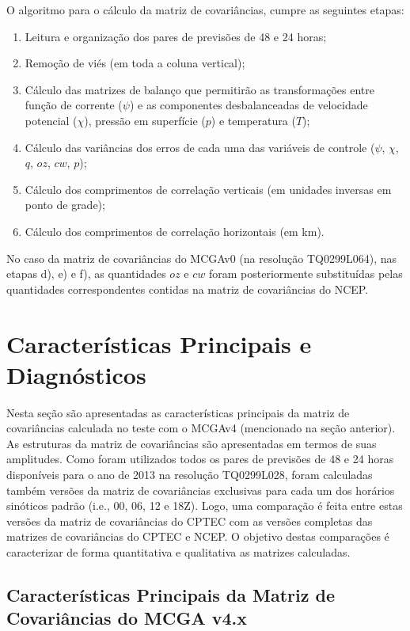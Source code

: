 O algoritmo para o cálculo da matriz de covariâncias, cumpre as seguintes etapas:

\begin{enumerate}
    \item Leitura e organização dos pares de previsões de 48 e 24 horas;
	\item Remoção de viés (em toda a coluna vertical);
	\item Cálculo das matrizes de balanço que permitirão as transformações entre função de corrente ($\psi$) e as componentes desbalanceadas de velocidade potencial ($\chi$), pressão em superfície ($p$) e temperatura ($T$);
	\item Cálculo das variâncias dos erros de cada uma das variáveis de controle ($\psi$, $\chi$, $q$, $oz$, $cw$, $p$);
	\item Cálculo dos comprimentos de correlação verticais (em unidades inversas em ponto de grade);
	\item Cálculo dos comprimentos de correlação horizontais (em km).      
\end{enumerate}

No caso da matriz de covariâncias do MCGAv0 (na resolução TQ0299L064), nas etapas d), e) e f), as quantidades $oz$ e $cw$ foram posteriormente substituídas pelas quantidades correspondentes contidas na matriz de covariâncias do NCEP.

\section{Características Principais e Diagnósticos}

Nesta seção são apresentadas as características principais da matriz de covariâncias calculada no teste com o MCGAv4 (mencionado na seção anterior). As estruturas da matriz de covariâncias são apresentadas em termos de suas amplitudes. Como foram utilizados todos os pares de previsões de 48 e 24 horas disponíveis para o ano de 2013 na resolução TQ0299L028, foram calculadas também versões da matriz de covariâncias exclusivas para cada um dos horários sinóticos padrão (i.e., 00, 06, 12 e 18Z). Logo, uma comparação é feita entre estas versões da matriz de covariâncias do CPTEC com as versões completas das matrizes de covariâncias do CPTEC e NCEP. O objetivo destas comparações é caracterizar de forma quantitativa e qualitativa as matrizes calculadas. 

\subsection*{Características Principais da Matriz de Covariâncias do MCGA v4.x}

